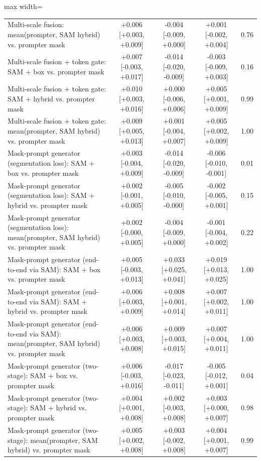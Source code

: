 \begin{table}[htbp]
\begin{adjustbox}{max width=\linewidth}
\begin{tabular}{lcccc}
Multi-scale fusion: mean(prompter, SAM hybrid) vs. prompter mask & +0.006 [+0.003, +0.009] & -0.004 [-0.009, +0.000] & +0.001 [-0.002, +0.004] & 0.76 \\
Multi-scale fusion + token gate: SAM + box vs. prompter mask & +0.007 [-0.003, +0.017] & -0.014 [-0.020, -0.009] & -0.003 [-0.009, +0.003] & 0.16 \\
Multi-scale fusion + token gate: SAM + hybrid vs. prompter mask & +0.010 [+0.003, +0.016] & +0.000 [-0.006, +0.006] & +0.005 [+0.001, +0.009] & 0.99 \\
Multi-scale fusion + token gate: mean(prompter, SAM hybrid) vs. prompter mask & +0.009 [+0.005, +0.013] & +0.001 [-0.004, +0.007] & +0.005 [+0.002, +0.009] & 1.00 \\
Mask-prompt generator (segmentation loss): SAM + box vs. prompter mask & +0.003 [-0.004, +0.009] & -0.014 [-0.020, -0.009] & -0.006 [-0.010, -0.001] & 0.01 \\
Mask-prompt generator (segmentation loss): SAM + hybrid vs. prompter mask & +0.002 [-0.001, +0.005] & -0.005 [-0.010, -0.000] & -0.002 [-0.005, +0.001] & 0.15 \\
Mask-prompt generator (segmentation loss): mean(prompter, SAM hybrid) vs. prompter mask & +0.002 [-0.000, +0.005] & -0.004 [-0.009, +0.000] & -0.001 [-0.004, +0.002] & 0.22 \\
Mask-prompt generator (end-to-end via SAM): SAM + box vs. prompter mask & +0.005 [-0.003, +0.013] & +0.033 [+0.025, +0.041] & +0.019 [+0.013, +0.025] & 1.00 \\
Mask-prompt generator (end-to-end via SAM): SAM + hybrid vs. prompter mask & +0.006 [+0.003, +0.009] & +0.008 [+0.001, +0.014] & +0.007 [+0.002, +0.011] & 1.00 \\
Mask-prompt generator (end-to-end via SAM): mean(prompter, SAM hybrid) vs. prompter mask & +0.006 [+0.003, +0.008] & +0.009 [+0.003, +0.015] & +0.007 [+0.004, +0.011] & 1.00 \\
Mask-prompt generator (two-stage): SAM + box vs. prompter mask & +0.006 [-0.003, +0.016] & -0.017 [-0.023, -0.011] & -0.005 [-0.012, +0.001] & 0.04 \\
Mask-prompt generator (two-stage): SAM + hybrid vs. prompter mask & +0.004 [+0.001, +0.008] & +0.002 [-0.003, +0.008] & +0.003 [+0.000, +0.007] & 0.98 \\
Mask-prompt generator (two-stage): mean(prompter, SAM hybrid) vs. prompter mask & +0.005 [+0.002, +0.008] & +0.003 [-0.002, +0.008] & +0.004 [+0.001, +0.007] & 0.99 \\

\end{tabular}
\end{adjustbox}
\end{table}
